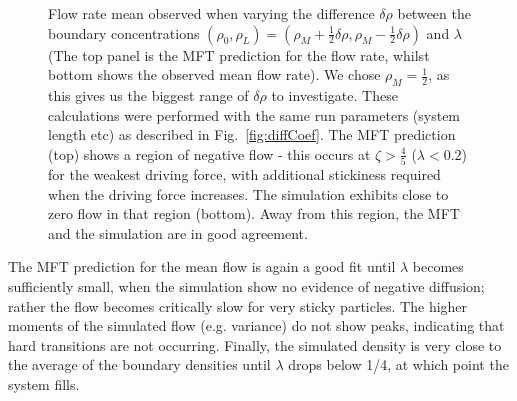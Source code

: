 \documentclass[
reprint, amsmath,amssymb,
]{revtex4-1}
\begin{document}
\begin{figure}[h!]
\begin{center}
\begin{tabular}{c}
    \end{tabular}
\end{center}
    \vspace{0em}
\caption{\label{fig:constDens} Flow rate mean observed when varying the difference $\delta\rho$ between the boundary concentrations
$(\rho_0, \rho_L) = (\rho_M + \frac{1}{2} \delta\rho, \rho_M - \frac{1}{2} \delta\rho)$ and $\lambda$ (The top panel is the MFT prediction
for the flow rate, whilst bottom shows the observed mean flow rate).
We chose $\rho_M=\frac{1}{2}$, as this gives us the biggest range of $\delta\rho$ to investigate.
These calculations were performed with the same run parameters (system length etc) as described in Fig.~\ref{fig:diffCoef}.
The MFT prediction (top) shows a region of
negative flow - this occurs at $\zeta > \frac{4}{5}$ ($\lambda < 0.2$) for the weakest
driving force, with additional stickiness required when the driving
force increases. The simulation exhibits close to zero flow in that
region (bottom).  Away from this region, the MFT and
the simulation are in good agreement.
}
\end{figure}

The MFT prediction for the mean flow is again a good fit until $\lambda$ becomes sufficiently small,
when the simulation show no evidence of negative diffusion; rather the flow becomes critically slow for very sticky particles.
The higher moments of the simulated flow (e.g. variance) do not show peaks, indicating that hard transitions are not occurring.
Finally, the  simulated density is very close to the average of the boundary densities until $\lambda$ drops below 1/4, at which point the system fills.
\end{document}
